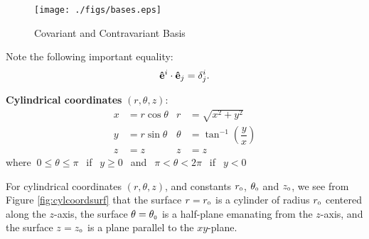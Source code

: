  \begin{figure}[h!]
 \centering
 \texttt{[image: ./figs/bases.eps]}
\caption{Covariant and Contravariant Basis}
\end{figure}



Note the following important equality:
\[\mathbf{\hat e}^i\cdot\mathbf{\hat e}_j = \delta^i_j.\]


\begin{exa}
 \textbf{Cylindrical coordinates} $(r,\theta,z)$:
 \begin{align*}
  x &= r \cos \theta & r &= \sqrt{x^2 + y^2}\\
  y &= r \sin \theta & \theta &= \tan^{-1} \left( \dfrac{y}{x} \right)\\
  z &= z & z &= z
 \end{align*}
 \vspace{3mm}where $~0 \le \theta \le \pi~~$ if $~~y \ge 0~~$ and $~~\pi < \theta < 2\pi~~$ if $~~y < 0$
 
 For cylindrical coordinates $(r,\theta,z)$, and constants $r_{\scriptscriptstyle 0}$, $\theta_{\scriptscriptstyle 0}$ and $z_{\scriptscriptstyle 0}$, we see
from Figure \ref{fig:cylcoordsurf}
that the surface $r = r_{\scriptscriptstyle 0}$ is a cylinder of radius $r_{\scriptscriptstyle 0}$ centered along the $z$-axis, the surface
$\theta = \theta_{\scriptscriptstyle 0}$ is a half-plane emanating from the $z$-axis, and the surface $z = z_{\scriptscriptstyle 0}$ is a plane
parallel to the $xy$-plane.


\end{exa}
